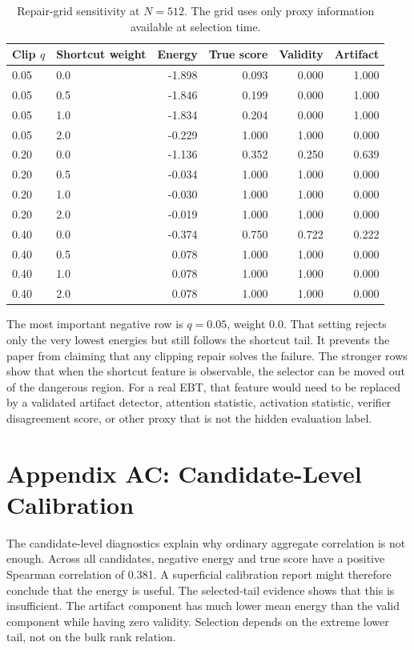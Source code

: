 \documentclass{article}
\begin{document}
\begin{table}[t]
\centering
\small
\begin{tabular}{llrrrr}
\toprule
Clip $q$ & Shortcut weight & Energy & True score & Validity & Artifact \\
\midrule
0.05 & 0.0 & -1.898 & 0.093 & 0.000 & 1.000 \\
0.05 & 0.5 & -1.846 & 0.199 & 0.000 & 1.000 \\
0.05 & 1.0 & -1.834 & 0.204 & 0.000 & 1.000 \\
0.05 & 2.0 & -0.229 & 1.000 & 1.000 & 0.000 \\
0.20 & 0.0 & -1.136 & 0.352 & 0.250 & 0.639 \\
0.20 & 0.5 & -0.034 & 1.000 & 1.000 & 0.000 \\
0.20 & 1.0 & -0.030 & 1.000 & 1.000 & 0.000 \\
0.20 & 2.0 & -0.019 & 1.000 & 1.000 & 0.000 \\
0.40 & 0.0 & -0.374 & 0.750 & 0.722 & 0.222 \\
0.40 & 0.5 & 0.078 & 1.000 & 1.000 & 0.000 \\
0.40 & 1.0 & 0.078 & 1.000 & 1.000 & 0.000 \\
0.40 & 2.0 & 0.078 & 1.000 & 1.000 & 0.000 \\
\bottomrule
\end{tabular}
\caption{Repair-grid sensitivity at $N=512$. The grid uses only proxy
information available at selection time.}
\label{tab:repair-grid-detail}
\end{table}

The most important negative row is $q=0.05$, weight 0.0. That setting rejects
only the very lowest energies but still follows the shortcut tail. It prevents
the paper from claiming that any clipping repair solves the failure. The
stronger rows show that when the shortcut feature is observable, the selector
can be moved out of the dangerous region. For a real EBT, that feature would
need to be replaced by a validated artifact detector, attention statistic,
activation statistic, verifier disagreement score, or other proxy that is not
the hidden evaluation label.

\section*{Appendix AC: Candidate-Level Calibration}

The candidate-level diagnostics explain why ordinary aggregate correlation is
not enough. Across all candidates, negative energy and true score have a
positive Spearman correlation of 0.381. A superficial calibration report might
therefore conclude that the energy is useful. The selected-tail evidence shows
that this is insufficient. The artifact component has much lower mean energy
than the valid component while having zero validity. Selection depends on the
extreme lower tail, not on the bulk rank relation.
\end{document}
